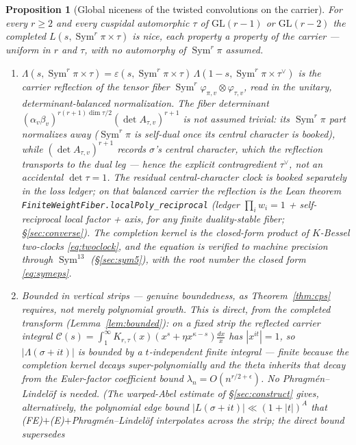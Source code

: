 \documentclass[11pt]{article}
\newtheorem{proposition}[theorem]{Proposition}
\theoremstyle{definition}
\newcommand{\Sym}{\operatorname{Sym}}
\begin{document}
\begin{proposition}[Global niceness of the twisted convolutions on the carrier]\label{prop:niceness}
For every $r\ge2$ and every cuspidal automorphic $\tau$ of $\mathrm{GL}(r-1)$ or $\mathrm{GL}(r-2)$
the completed $L(s,\Sym^r\pi\times\tau)$ is nice, each property a property of the carrier --- uniform
in $r$ and $\tau$, with no automorphy of $\Sym^r\pi$ assumed.
\begin{enumerate}
\item[\textup{(FE)}]
$\Lambda(s,\Sym^r\pi\times\tau)=\varepsilon(s,\Sym^r\pi\times\tau)\,\Lambda(1-s,\Sym^r\pi\times\tau^{\vee})$
is the carrier reflection of the tensor fiber $\Sym^r\varphi_{\pi,v}\otimes\varphi_{\tau,v}$, read in the
\emph{unitary, determinant-balanced} normalization. The fiber determinant
$(\alpha_v\beta_v)^{r(r+1)\dim\tau/2}(\det A_{\tau,v})^{r+1}$ is \emph{not} assumed trivial: its
$\Sym^r\pi$ part normalizes away ($\Sym^r\pi$ is self-dual once its central character is booked), while
$(\det A_{\tau,v})^{r+1}$ records $\sigma$'s central character, which the reflection transports to the dual
leg --- hence the explicit contragredient $\tau^{\vee}$, not an accidental $\det\tau=1$. The residual
central-character clock is booked separately in the loss ledger; on that balanced carrier the reflection is
the Lean theorem \texttt{FiniteWeightFiber.localPoly\_reciprocal} (ledger $\prod_i w_i=1$ + self-reciprocal
local factor + axis, for any finite duality-stable fiber; \S\ref{sec:converse}). The completion kernel is the
closed-form product of $K$-Bessel two-clocks \eqref{eq:twoclock}, and the equation is verified to machine
precision through $\Sym^{13}$ (\S\ref{sec:sym5}), with the root number the closed form \eqref{eq:symeps}.
\item[\textup{(B)}] \emph{Bounded in vertical strips} --- genuine boundedness, as Theorem~\ref{thm:cps}
requires, not merely polynomial growth. This is direct, from the completed transform (Lemma~\ref{lem:bounded}):
on a fixed strip the reflected carrier integral $\mathcal C(s)=\int_1^\infty K_{r,\tau}(x)(x^{s}+\eta x^{\kappa-s})
\tfrac{dx}{x}$ has $|x^{it}|=1$, so $|\Lambda(\sigma+it)|$ is bounded by a $t$-independent finite integral --- finite
because the completion kernel decays super-polynomially and the theta inherits that decay from the Euler-factor
coefficient bound $\lambda_n=O(n^{r/2+\epsilon})$. No Phragm\'en--Lindel\"of is needed. (The warped-Abel estimate
of \S\ref{sec:construct} gives, alternatively, the polynomial edge bound $|L(\sigma+it)|\ll(1+|t|)^A$ that
\textup{(FE)}$+$\textup{(E)}$+$Phragm\'en--Lindel\"of interpolates across the strip; the direct bound supersedes

\end{enumerate}
\end{proposition}
\end{document}
